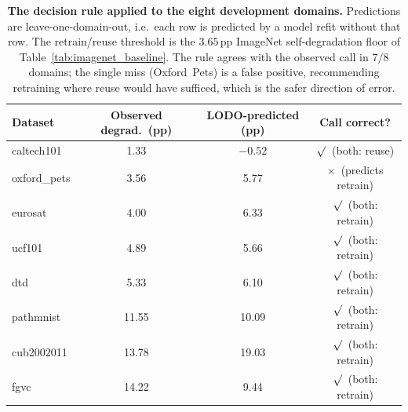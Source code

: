 \begin{table}[htbp]
\centering
\small
\caption{\textbf{The decision rule applied to the eight development domains.}
Predictions are leave-one-domain-out, i.e.\ each row is predicted by a model refit
without that row. The retrain/reuse threshold is the $3.65$\,pp ImageNet
self-degradation floor of Table~\ref{tab:imagenet_baseline}. The rule agrees with the
observed call in $7/8$ domains; the single miss (Oxford~Pets) is a false positive,
recommending retraining where reuse would have sufficed, which is the safer direction
of error.}
\label{tab:decision_rule}
\setlength{\tabcolsep}{6pt}
\begin{tabular}{lccc}
\toprule
\textbf{Dataset} & \textbf{Observed degrad.\ (pp)} & \textbf{LODO-predicted (pp)} & \textbf{Call correct?} \\
\midrule
caltech101   & 1.33  & $-0.52$ & $\surd$\ (both: reuse) \\
oxford\_pets & 3.56  & 5.77  & $\times$\ (predicts retrain) \\
eurosat      & 4.00  & 6.33  & $\surd$\ (both: retrain) \\
ucf101       & 4.89  & 5.66  & $\surd$\ (both: retrain) \\
dtd          & 5.33  & 6.10  & $\surd$\ (both: retrain) \\
pathmnist    & 11.55 & 10.09 & $\surd$\ (both: retrain) \\
cub2002011   & 13.78 & 19.03 & $\surd$\ (both: retrain) \\
fgvc         & 14.22 & 9.44  & $\surd$\ (both: retrain) \\
\bottomrule
\end{tabular}
\end{table}

